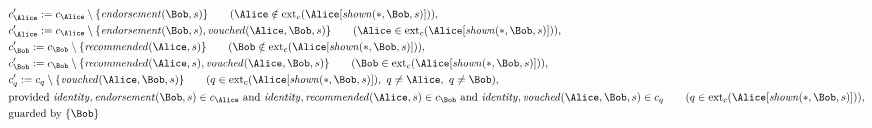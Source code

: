 \begin{align*}
&
c'_
{
\Alice
}
 := 
c_
{
\Alice
}
 \setminus 
\{
\mathit{
endorsement
}
(
\Bob
,
s
)
\}
 \qquad (
\Alice
 \notin 
\mathrm{ext}_c(
\Alice
[
\mathit{
shown
}
(
\ast
,
\Bob
,
s
)
]
)
)
,\\
&
c'_
{
\Alice
}
 := 
c_
{
\Alice
}
 \setminus 
\{
\mathit{
endorsement
}
(
\Bob
,
s
)
,
\mathit{
vouched
}
(
\Alice
,
\Bob
,
s
)
\}
 \qquad (
\Alice
 \in 
\mathrm{ext}_c(
\Alice
[
\mathit{
shown
}
(
\ast
,
\Bob
,
s
)
]
)
)
,\\
&
c'_
{
\Bob
}
 := 
c_
{
\Bob
}
 \setminus 
\{
\mathit{
recommended
}
(
\Alice
,
s
)
\}
 \qquad (
\Bob
 \notin 
\mathrm{ext}_c(
\Alice
[
\mathit{
shown
}
(
\ast
,
\Bob
,
s
)
]
)
)
,\\
&
c'_
{
\Bob
}
 := 
c_
{
\Bob
}
 \setminus 
\{
\mathit{
recommended
}
(
\Alice
,
s
)
,
\mathit{
vouched
}
(
\Alice
,
\Bob
,
s
)
\}
 \qquad (
\Bob
 \in 
\mathrm{ext}_c(
\Alice
[
\mathit{
shown
}
(
\ast
,
\Bob
,
s
)
]
)
)
,\\
&
c'_
q
 := 
c_
q
 \setminus 
\{
\mathit{
vouched
}
(
\Alice
,
\Bob
,
s
)
\}
 \qquad (
q
 \in 
\mathrm{ext}_c(
\Alice
[
\mathit{
shown
}
(
\ast
,
\Bob
,
s
)
]
)
,\ 
q \neq 
\Alice
,\ 
q \neq 
\Bob
)
,\\
&
\text{provided } 
\mathit{
identity
}
,
\mathit{
endorsement
}
(
\Bob
,
s
)
 \in c_
{
\Alice
}
 \text{ and } 
\mathit{
identity
}
,
\mathit{
recommended
}
(
\Alice
,
s
)
 \in c_
{
\Bob
}
 \text{ and } 
\mathit{
identity
}
,
\mathit{
vouched
}
(
\Alice
,
\Bob
,
s
)
 \in c_
q
 \qquad (
q \in 
\mathrm{ext}_c(
\Alice
[
\mathit{
shown
}
(
\ast
,
\Bob
,
s
)
]
)
)
,\\
&
\text{guarded by } \{
\Bob
\}
\end{align*}
